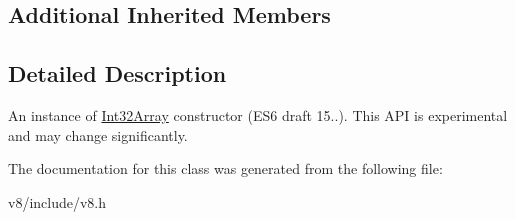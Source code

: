 \subsection*{Additional Inherited Members}


\subsection{Detailed Description}
An instance of \hyperlink{classv8_1_1Int32Array}{Int32\+Array} constructor (E\+S6 draft 15..). This A\+P\+I is experimental and may change significantly. 

The documentation for this class was generated from the following file\+:\begin{DoxyCompactItemize}
\item 
v8/include/v8.\+h\end{DoxyCompactItemize}
